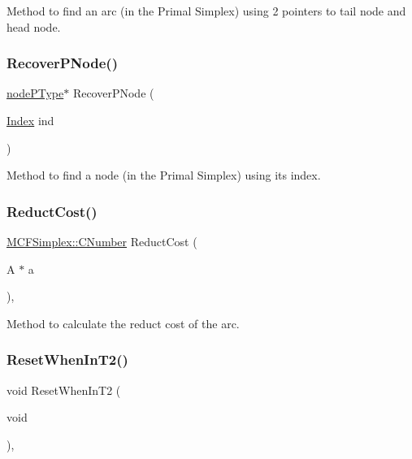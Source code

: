 Method to find an arc (in the Primal Simplex) using 2 pointers to tail node and head node. \mbox{\label{class_m_c_f_simplex_a28596ee71a4238aeb935ac426c8c21c4}} 
\subsubsection{\texorpdfstring{Recover\+P\+Node()}{RecoverPNode()}}
{\footnotesize\ttfamily \mbox{\hyperlink{struct_m_c_f_simplex_1_1node_p_type}{node\+P\+Type}}$\ast$ Recover\+P\+Node (\begin{DoxyParamCaption}\item[{\mbox{\hyperlink{class_m_c_f_class_ad53d6229d7ec28555a9c9c2fd9abf773}{Index}}}]{ind }\end{DoxyParamCaption})\hspace{0.3cm}{\ttfamily [private]}}

Method to find a node (in the Primal Simplex) using its index. \mbox{\label{class_m_c_f_simplex_a7d2dd2965903fbbc7a55dee9e025d7a9}} 
\subsubsection{\texorpdfstring{Reduct\+Cost()}{ReductCost()}}
{\footnotesize\ttfamily \mbox{\hyperlink{class_m_c_f_class_a24d0627ba8213afe1ec4ebeb4508e8f1}{M\+C\+F\+Simplex\+::\+C\+Number}} Reduct\+Cost (\begin{DoxyParamCaption}\item[{A $\ast$}]{a }\end{DoxyParamCaption})\hspace{0.3cm}{\ttfamily [inline]}, {\ttfamily [private]}}

Method to calculate the reduct cost of the arc. \mbox{\label{class_m_c_f_simplex_a626f2d6f97a01eba10c4fe5a0af5789d}} 
\subsubsection{\texorpdfstring{Reset\+When\+In\+T2()}{ResetWhenInT2()}}
{\footnotesize\ttfamily void Reset\+When\+In\+T2 (\begin{DoxyParamCaption}\item[{void}]{ }\end{DoxyParamCaption})\hspace{0.3cm}{\ttfamily [inline]}, {\ttfamily [private]}}

